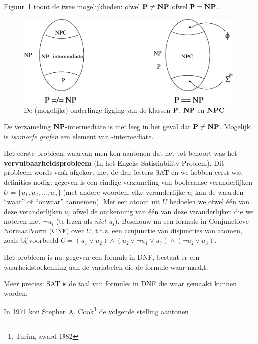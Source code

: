 Figuur~\ref{NP-venn} toont de twee mogelijkheden: ofwel $\P \neq \NP$
ofwel $\P = \NP$.

\begin{figure}[ht]
\begin{center}
\includegraphics[width=0.7\linewidth,keepaspectratio]{NP-venn}
\end{center}
\caption{De (mogelijke) onderlinge ligging van de klassen $\P$, $\NP$
  en $\NPC$
 \label{NP-venn}}
\end{figure}
De verzameling $\NP$-intermediate is niet leeg in het geval dat $\P \neq
\NP$. Mogelijk is {\em isomorfe grafen} een element van \NP-intermediate.


Het eerste probleem waarvan men kon aantonen dat het tot \NPC behoort
was het {\bf vervulbaarheidsprobleem} (In het Engels: Satisfiability
Problem).  Dit probleem wordt vaak afgekort met de drie letters SAT en
we hebben eerst wat definities nodig: gegeven is een eindige
verzameling van booleaanse veranderlijken $U = \{u_1,u_2,\ldots,u_n\}$
(met andere woorden, elke veranderlijke $u_i$ kan de waarden ``waar''
of ``onwaar'' aannemen).  Met een atoom uit $U$ bedoelen we ofwel
\'e\'en van deze veranderlijken $u_i$ ofwel de ontkenning van \'e\'en
van deze veranderlijken die we noteren met $\neg {u}_i$ (te lezen als
{\em niet $u_i$}). Beschouw nu een formule in Conjunctieve NormaalVorm
(CNF) over $U$, t.t.z. een conjunctie van disjuncties van atomen,
zoals bijvoorbeeld
%
$C= (u_1 \vee u_2) \wedge (u_2 \vee \neg u_4 \vee u_7) \wedge  (\neg u_2 \vee u_3)$.

Het probleem is nu: gegeven een formule in DNF, bestaat er een
waarheidstoekenning aan de variabelen die de formule waar maakt.

Meer precies: SAT is de taal van formules in DNF die waar gemaakt
kunnen worden.

In 1971 kon Stephen A. Cook\footnote{Turing award 1982} de volgende stelling aantonen






